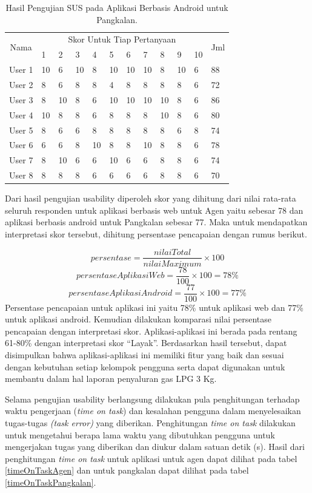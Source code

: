 \begin{table}[H]
	\center
	\caption{Hasil Pengujian SUS pada Aplikasi Berbasis Android untuk Pangkalan.}
	\label{hasilSusPangkalan}
	\begin{tabular}{|c|l|l|l|l|l|l|l|l|l|l|l|}
		\hline
		\multirow{2}{*}{Nama} & \multicolumn{10}{c|}{Skor Untuk Tiap Pertanyaan} &  \multirow{2}{0.5cm}{Jml} \\ \cline{2-11} 
		&1 &2  &3 &4 &5 &6 &7 &8 &9 &10& \\
		\hline
		User 1 &10 &6 &10 &8 &10 &10 &10 &8 &10 &6 &88 \\ 
		\hline
		User 2 &8 &6 &8 &8 &4 &8 &8 &8 &8 &6 &72 \\ 
		\hline
		User 3 &8 &10 &8 &6 &10 &10 &10 &10 &8 &6 &86 \\ 
		\hline
		User 4 &10 &8 &8 &6 &8 &8 &8 &10 &8 &6 &80 \\ 
		\hline
		User 5 &8 &6 &6 &8 &8 &8 &8 &8 &6 &8 &74 \\ 
		\hline
		User 6 &6 &6 &8 &10 &8 &8 &10 &8 &8 &6 &78 \\ 
		\hline
		User 7 &8 &10 &6 &6 &10 &6 &6 &8 &8 &6 &74 \\ 
		\hline
		User 8 &8 &8 &8 &6 &6 &6 &6 &8 &8 &6 &70 \\ 
		\hline
	\end{tabular}
\end{table}

Dari hasil pengujian usability diperoleh skor yang dihitung dari nilai rata-rata seluruh responden untuk aplikasi berbasis web untuk Agen yaitu sebesar 78 dan aplikasi berbasis android untuk Pangkalan sebesar 77. Maka untuk mendapatkan interpretasi skor tersebut, dihitung persentase pencapaian dengan rumus berikut. 

\[persentase = \frac{nilai Total}{nilai Maximum}\times100\]
\[persentase Aplikasi Web = \frac{78}{100}\times100=78\%\]
\[persentase Aplikasi Android = \frac{77}{100}\times100=77\%\]
\newpage
Persentase pencapaian untuk aplikasi ini yaitu 78\% untuk aplikasi web dan 77\% untuk aplikasi android. Kemudian dilakukan komparasi nilai persentase pencapaian dengan interpretasi skor. Aplikasi-aplikasi ini berada pada rentang 61-80\% dengan interpretasi skor “Layak”. Berdasarkan hasil tersebut, dapat disimpulkan bahwa aplikasi-aplikasi ini memiliki fitur yang baik dan sesuai dengan kebutuhan setiap kelompok pengguna serta dapat digunakan untuk membantu dalam hal laporan penyaluran gas LPG 3 Kg.  

Selama pengujian usability berlangsung dilakukan pula penghitungan terhadap waktu pengerjaan (\textit{time on task}) dan kesalahan pengguna dalam menyelesaikan tugas-tugas \textit{(task error)} yang diberikan. Penghitungan\textit{ \textit{time on task}} dilakukan untuk mengetahui berapa lama waktu yang dibutuhkan pengguna untuk mengerjakan tugas yang diberikan dan diukur dalam satuan detik (s). Hasil dari penghitungan \textit{time on task} untuk aplikasi untuk agen dapat dilihat pada tabel \ref{timeOnTaskAgen} dan untuk pangkalan dapat dilihat pada tabel \ref{timeOnTaskPangkalan}. 

